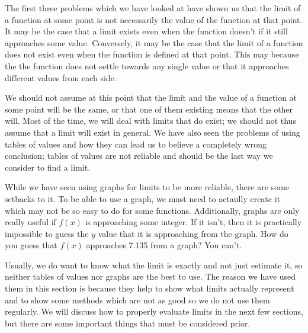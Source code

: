 \documentclass[12pt]{article}
\theoremstyle{definition}
\begin{document}
The first three problems which we have looked at have shown us that the limit of a function at some point is not necessarily the value of the function at that point.
It may be the case that a limit exists even when the function doesn't if it still approaches some value.
Conversely, it may be the case that the limit of a function does not exist even when the function is defined at that point.
This may because the the function does not settle towards any single value or that it approaches different values from each side.

We should not assume at this point that the limit and the value of a function at some point will be the same, or that one of them existing means that the other will.
Most of the time, we will deal with limits that do exist; we should not thus assume that a limit will exist in general.
We have also seen the problems of using tables of values and how they can lead us to believe a completely wrong conclusion; tables of values are not reliable and should be the last way we consider to find a limit.

While we have seen using graphs for limits to be more reliable, there are some setbacks to it.
To be able to use a graph, we must need to actaully create it which may not be so easy to do for some functions.
Additionally, graphs are only really useful if $f(x)$ is approaching some integer.
If it isn't, then it is practically impossible to guess the $y$ value that it is approaching from the graph.
How do you guess that $f(x)$ approaches 7.135 from a graph?
You can't.

Usually, we do want to know what the limit is exactly and not just estimate it, so neither tables of values nor graphs are the best to use.
The reason we have used them in this section is because they help to show what limits actually represent and to show some methods which are not as good so we do not use them regularly.
We will discuss how to properly evaluate limits in the next few sections, but there are some important things that must be considered prior.
\end{document}
